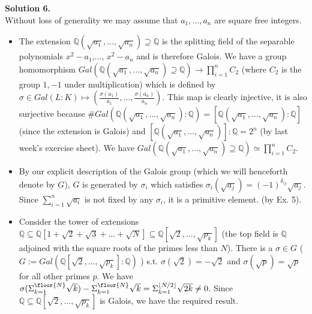 \documentclass[12pt,a4paper]{article}
\begin{document}
\textbf{Solution 6.}\\
Without loss of generality we may assume that $a_1,...,a_n$ are square free integers.
\begin{itemize}
    \item The extension $\mathbb{Q}(\sqrt{a_1}, ... , \sqrt{a_n})\supseteq \mathbb{Q}$ is the splitting field of the separable polynomials $x^2-a_1$,..., $x^2-a_n$ and is therefore Galois. We have a group homomorphism $Gal(\mathbb{Q}(\sqrt{a_1}, ... , \sqrt{a_n})\supseteq \mathbb{Q})\xrightarrow{} \prod_{i=1}^n C_2$ (where $C_2$ is the group ${1, -1}$ under multiplication) which is defined by $\sigma\in Gal(L:K)\mapsto (\frac{\sigma(a_1)}{a_1}, \dots, \frac{\sigma(a_n)}{a_n})$. This map is clearly injective, it is also surjective because $\#Gal(\mathbb{Q}(\sqrt{a_1}, ... , \sqrt{a_n}):\mathbb{Q})=[\mathbb{Q}(\sqrt{a_1}, ... , \sqrt{a_n}):\mathbb{Q}]$ (since the extension is Galois) and $[\mathbb{Q}(\sqrt{a_1}, ... , \sqrt{a_n})]:\mathbb{Q}=2^n$ (by last week's exercise sheet). We have $Gal(\mathbb{Q}(\sqrt{a_1}, ... , \sqrt{a_n})\supseteq \mathbb{Q})\simeq \prod_{i=1}^n C_2$. 
    
    \item By our explicit description of the Galois group (which we will henceforth denote by $G$), $G$ is generated by $\sigma_i$ which satisfies $\sigma_i(\sqrt{a_j})=(-1)^{\delta_{ij}}\sqrt{a_j}$. Since $\sum_{i=1}^{n}\sqrt{a_i}$ is not fixed by any $\sigma_i$, it is a primitive element. (by Ex. 5).
    
    \item Consider the tower of extensions $\mathbb{Q}\subseteq \mathbb{Q}[1 + \sqrt{2} + \sqrt{3} + ... + \sqrt{N}]\subseteq \mathbb{Q}[\sqrt{2},...,\sqrt{p_k}]$ (the top field is $\mathbb{Q}$ adjoined with the square roots of the primes less than $N$). There is a $\sigma\in G$ ($G:=Gal(\mathbb{Q}[\sqrt{2},...,\sqrt{p_k}]:\mathbb{Q})$ ) s.t. $\sigma(\sqrt{2})=-\sqrt{2}$ and $\sigma(\sqrt{p})=\sqrt{p}$ for all other primes $p$. We have $\sigma(\Sigma_{k=1}^{\floor{N}}\sqrt{k})-\Sigma_{k=1}^{\floor{N}}\sqrt{k}=\Sigma_{k=1}^{\lfloor{N/2}\rfloor}\sqrt{2k}\neq 0$. Since $\mathbb{Q} \subseteq \mathbb{Q}[\sqrt{2},...,\sqrt{p_k}]$ is Galois, we have the required result.
    
    \end{itemize}
\end{document}
